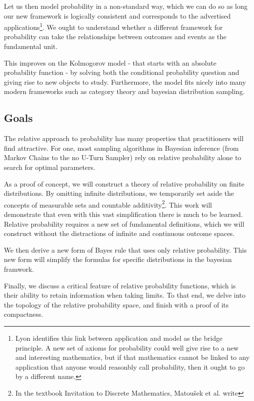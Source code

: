\documentclass[twoside]{article}
\theoremstyle{plain}%
\theoremstyle{definition}
\theoremstyle{remark}
\begin{document}
Let us then model probability in a non-standard way, which we can do so as long our new framework is logically consistent and corresponds to the advertised applications\footnote{Lyon identifies this link between application and model as the bridge principle. A new set of axioms for probability could well give rise to a new and interesting mathematics, but if that mathematics cannot be linked to any application that anyone would reasonbly call probability, then it ought to go by a different name.}. We ought to understand whether a different framework for probability can take the relationships between outcomes and events as the fundamental unit.

This improves on the Kolmogorov model - that starts with an absolute probability function - by solving both the conditional probability question and giving rise to new objects to study. Furthermore, the model fits nicely into many modern frameworks such as category theory and bayesian distribution sampling.

\subsection{Goals}

The relative approach to probability has many properties that practitioners will find attractive. For one, most sampling algorithms in Bayesian inference (from Markov Chains to the no U-Turn Sampler) rely on relative probability alone to search for optimal parameters. 

As a proof of concept, we will construct a theory of relative probability on finite distributions. By omitting infinite distributions, we temporarily set aside the concepts of measurable sets and countable additivity\footnote{In the textbook Invitation to Discrete Mathematics, Matoušek et al. write }. This work will demonstrate that even with this vast simplification there is much to be learned. Relative probability requires a new set of fundamental definitions, which we will construct without the distractions of infinite and continuous outcome spaces.

We then derive a new form of Bayes rule that uses only relative probability. This new form will simplify the formulas for specific distributions in the bayesian framwork.

Finally, we discuss a critical feature of relative probability functions,
which is their ability to retain information when taking limits. To that end, we delve into the topology of the relative probability space, and finish with a proof of its compactness.
\end{document}
